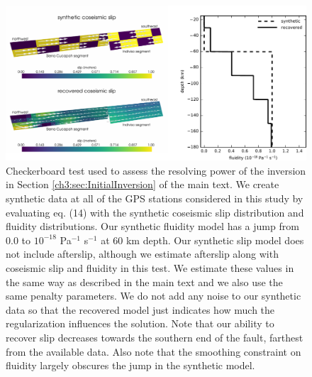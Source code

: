 \begin{figure}
\noindent\includegraphics[scale=0.9]{ch3/figures/2016jb013114-pS02}
\caption{Checkerboard test used to assess the resolving power of the
inversion in Section \ref{ch3:sec:InitialInversion} of the main text.  We create synthetic data
at all of the GPS stations considered in this study by evaluating eq.
(14) with the synthetic coseismic slip distribution and fluidity
distributions. Our synthetic fluidity model has a jump from 0.0 to
$10^{-18}$ Pa$^{-1}$ s$^{-1}$ at 60 km depth.  Our synthetic slip
model does not include afterslip, although we estimate afterslip along
with coseismic slip and fluidity in this test.  We estimate these
values in the same way as described in the main text and we also use
the same penalty parameters.  We do not add any noise to our synthetic
data so that the recovered model just indicates how much the
regularization influences the solution.  Note that our ability to
recover slip decreases towards the southern end of the fault, farthest
from the available data.  Also note that the smoothing constraint on
fluidity largely obscures the jump in the synthetic model.}
\label{ch3:fig:S2}
\end{figure}

